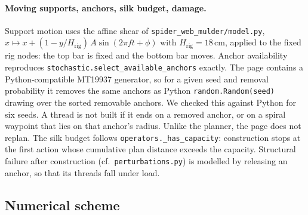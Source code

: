 \paragraph{Moving supports, anchors, silk budget, damage.}
Support motion uses the affine shear of \texttt{spider\_web\_mulder/model.py},
$x \mapsto x + (1 - y/H_{\text{rig}})\,A\sin(2\pi f t+\phi)$ with $H_{\text{rig}}=18$\,cm, applied to the fixed rig
nodes: the top bar is fixed and the bottom bar moves. Anchor availability reproduces
\texttt{stochastic.select\_available\_anchors} exactly. The page contains a Python-compatible MT19937 generator, so
for a given seed and removal probability it removes the same anchors as Python \texttt{random.Random(seed)} drawing
over the sorted removable anchors. We checked this against Python for six seeds. A thread is not built if it ends on a
removed anchor, or on a spiral waypoint that lies on that anchor's radius. Unlike the planner, the page does not
replan. The silk budget follows \texttt{operators.\_has\_capacity}: construction stops at the first action whose
cumulative plan distance exceeds the capacity. Structural failure after construction (cf.\ \texttt{perturbations.py})
is modelled by releasing an anchor, so that its threads fall under load.

\subsection{Numerical scheme}
\label{sec:sim-numerics}

